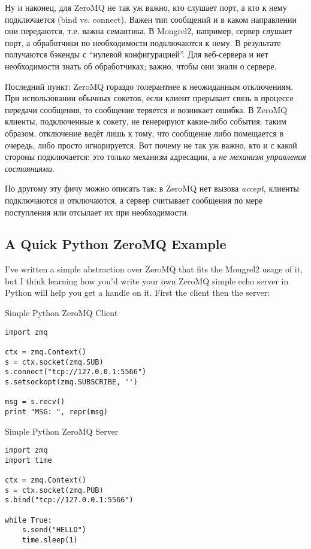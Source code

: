 Ну и наконец, для ZeroMQ не так уж важно, кто слушает порт, а кто к нему
подключается (bind vs. connect). Важен тип сообщений и в каком направлении они
передаются, т.е. важна семантика. В Mongrel2, например, сервер слушает порт, а
обработчики по необходимости подключаются к нему. В результате получаются
бэкенды с ``нулевой конфигурацией''. Для веб-сервера и нет необходимости знать
об обработчиках; важно, чтобы они знали о сервере.

Последний пункт: ZeroMQ гораздо толерантнее к неожиданным отключениям. При
использовании обычных сокетов, если клиент прерывает связь в процессе передачи
сообщения, то сообщение теряется и возникает ошибка. В ZeroMQ клиенты,
подключенные к сокету, не генерируют какие-либо события; таким образом,
отключение ведёт лишь к тому, что сообщение либо помещается в очередь, либо
просто игнорируется. Вот почему не так уж важно, кто и с какой стороны
подключается: это только механизм адресации, а \emph{не механизм управления
состояниями}.

По другому эту фичу можно описать так: в ZeroMQ нет вызова \emph{accept},
клиенты подключаются и отключаются, а сервер считывает сообщения по мере
поступления или отсылает их при необходимости.

\subsection{A Quick Python ZeroMQ Example}

I've written a simple abstraction over ZeroMQ that fits the Mongrel2 usage of it, but
I think learning how you'd write your own ZeroMQ simple echo server in Python will
help you get a handle on it.  First the client then the server:

\begin{code}{Simple Python ZeroMQ Client}
\begin{lstlisting}
import zmq

ctx = zmq.Context()
s = ctx.socket(zmq.SUB)
s.connect("tcp://127.0.0.1:5566")
s.setsockopt(zmq.SUBSCRIBE, '')

msg = s.recv()
print "MSG: ", repr(msg)
\end{lstlisting}
\end{code}


\begin{code}{Simple Python ZeroMQ Server}
\begin{lstlisting}
import zmq
import time

ctx = zmq.Context()
s = ctx.socket(zmq.PUB)
s.bind("tcp://127.0.0.1:5566")

while True:
    s.send("HELLO")
    time.sleep(1)
\end{lstlisting}
\end{code}



